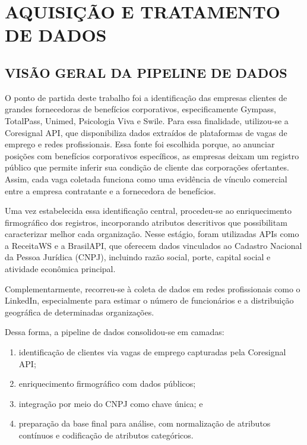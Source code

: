 \chapter{AQUISIÇÃO E TRATAMENTO DE DADOS}

\section{VISÃO GERAL DA PIPELINE DE DADOS}

O ponto de partida deste trabalho foi a identificação das empresas clientes de grandes fornecedoras de benefícios corporativos, especificamente Gympass, TotalPass, Unimed, Psicologia Viva e Swile. Para essa finalidade, utilizou-se a Coresignal API, que disponibiliza dados extraídos de plataformas de vagas de emprego e redes profissionais. Essa fonte foi escolhida porque, ao anunciar posições com benefícios corporativos específicos, as empresas deixam um registro público que permite inferir sua condição de cliente das corporações ofertantes. Assim, cada vaga coletada funciona como uma evidência de vínculo comercial entre a empresa contratante e a fornecedora de benefícios.

Uma vez estabelecida essa identificação central, procedeu-se ao enriquecimento firmográfico dos registros, incorporando atributos descritivos que possibilitam caracterizar melhor cada organização. Nesse estágio, foram utilizadas APIs como a ReceitaWS e a BrasilAPI, que oferecem dados vinculados ao Cadastro Nacional da Pessoa Jurídica (CNPJ), incluindo razão social, porte, capital social e atividade econômica principal. 

Complementarmente, recorreu-se à coleta de dados em redes profissionais como o LinkedIn, especialmente para estimar o número de funcionários e a distribuição geográfica de determinadas organizações.

Dessa forma, a pipeline de dados consolidou-se em camadas: 
\begin{enumerate}
    \item identificação de clientes via vagas de emprego capturadas pela Coresignal API;
    \item enriquecimento firmográfico com dados públicos;
    \item integração por meio do CNPJ como chave única; e
    \item preparação da base final para análise, com normalização de atributos contínuos e codificação de atributos categóricos.
\end{enumerate}

